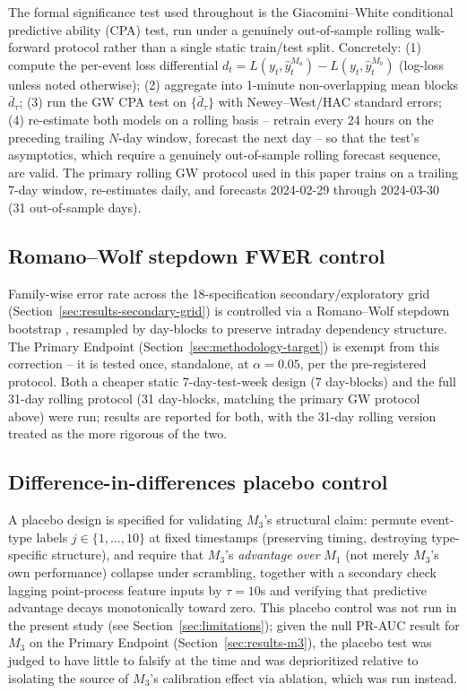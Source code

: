 The formal significance test used throughout is the Giacomini--White
\citep{giacomini2006tests} conditional predictive ability (CPA) test, run under a genuinely
out-of-sample rolling walk-forward protocol rather than a single static
train/test split. Concretely: (1) compute the per-event loss differential
$d_t = L(y_t, \hat y_t^{M_a}) - L(y_t, \hat y_t^{M_b})$ (log-loss unless
noted otherwise); (2) aggregate into 1-minute non-overlapping mean blocks
$\bar d_\tau$; (3) run the GW CPA test on $\{\bar d_\tau\}$ with
Newey--West/HAC standard errors; (4) re-estimate both models on a
rolling basis -- retrain every 24 hours on the preceding trailing
$N$-day window, forecast the next day -- so that the test's asymptotics,
which require a genuinely out-of-sample rolling forecast sequence, are
valid. The primary rolling GW protocol used in this paper trains on a
trailing 7-day window, re-estimates daily, and forecasts
2024-02-29 through 2024-03-30 (31 out-of-sample days).

\subsection{Romano--Wolf stepdown FWER control}
\label{sec:methodology-rw}

Family-wise error rate across the 18-specification secondary/exploratory
grid (Section~\ref{sec:results-secondary-grid}) is controlled via a
Romano--Wolf stepdown bootstrap \citep{romano2005stepwise,romano2005exact},
resampled by day-blocks to preserve
intraday dependency structure. The Primary Endpoint
(Section~\ref{sec:methodology-target}) is exempt from this correction --
it is tested once, standalone, at $\alpha = 0.05$, per the pre-registered
protocol. Both a cheaper static 7-day-test-week design (7 day-blocks) and
the full 31-day rolling protocol (31 day-blocks, matching the primary GW
protocol above) were run; results are reported for both, with the 31-day
rolling version treated as the more rigorous of the two.

\subsection{Difference-in-differences placebo control}
\label{sec:methodology-placebo}

A placebo design is specified for validating $M_3$'s structural claim:
permute event-type labels $j \in \{1,\dots,10\}$ at fixed timestamps
(preserving timing, destroying type-specific structure), and require
that $M_3$'s \emph{advantage over} $M_1$ (not merely $M_3$'s own
performance) collapse under scrambling, together with a secondary check
lagging point-process feature inputs by $\tau=10$s and verifying that
predictive advantage decays monotonically toward zero. This placebo
control was not run in the present study (see
Section~\ref{sec:limitations}); given the null PR-AUC result for $M_3$
on the Primary Endpoint (Section~\ref{sec:results-m3}), the placebo test
was judged to have little to falsify at the time and was deprioritized
relative to isolating the source of $M_3$'s calibration effect via
ablation, which was run instead.

